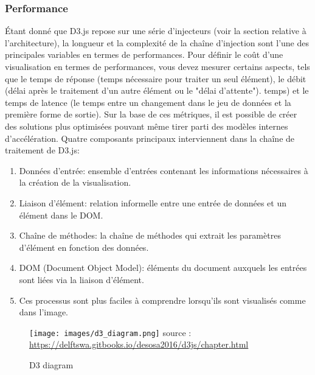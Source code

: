 \documentclass[french, a4paper, 12pt]{report}
\begin{document}
\subsubsection{Performance}
Étant donné que D3.js repose sur une série d’injecteurs (voir la section relative à l’architecture), la longueur et la complexité de la chaîne d’injection sont l’une des principales variables en termes de performances. Pour définir le coût d'une visualisation en termes de performances, vous devez mesurer certains aspects, tels que le temps de réponse (temps nécessaire pour traiter un seul élément), le débit (délai après le traitement d'un autre élément ou le "délai d'attente"). temps) et le temps de latence (le temps entre un changement dans le jeu de données et la première forme de sortie). Sur la base de ces métriques, il est possible de créer des solutions plus optimisées pouvant même tirer parti des modèles internes d’accélération.
Quatre composants principaux interviennent dans la chaîne de traitement de D3.js:
\begin{enumerate}
    \item Données d'entrée: ensemble d'entrées contenant les informations nécessaires à la création de la visualisation.
    \item Liaison d'élément: relation informelle entre une entrée de données et un élément dans le DOM.
    \item Chaîne de méthodes: la chaîne de méthodes qui extrait les paramètres d'élément en fonction des données.
    \item DOM (Document Object Model): éléments du document auxquels les entrées sont liées via la liaison d'élément.
    \item Ces processus sont plus faciles à comprendre lorsqu’ils sont visualisés comme dans l’image.
    
\end{enumerate}
\begin{figure}[!htp]
    \centering
    \texttt{[image: images/d3\_diagram.png]}
    \scriptsize{source : \url{https://delftswa.gitbooks.io/desosa2016/d3js/chapter.html}}
    \caption{D3 diagram}
    \label{fig:1.15}
\end{figure}
\end{document}
